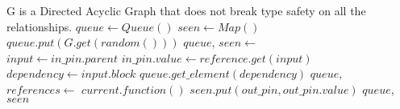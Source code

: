 \documentclass[12pt, varwidth=20cm]{standalone}
\begin{document}
		\begin{algorithmic}[1]
			\Require G is a Directed Acyclic Graph that does not break
			type safety on all the relationships.
				\State $queue \gets Queue()$
				\State $seen \gets Map()$
				\State $queue.put(G.get(random()))$ 
					\State $queue$, $seen \gets$ 
				\EndWhile
			\EndFunction
			\\
					\State $input \gets in\_pin.parent$
						\State $in\_pin.value \gets reference.get(input)$
					\Else
						\State $dependency \gets input.block$
						 
							\State $queue.get\_element(dependency)$
						\EndIf
						\State $queue$, $references \gets$ 
					\EndIf
				\EndFor
				\State $current.function()$ 
					\State $seen.put(out\_pin, out\_pin.value)$
				\EndFor
				\State \Return $queue$, $seen$
			\EndFunction
		\end{algorithmic}
\end{document}

